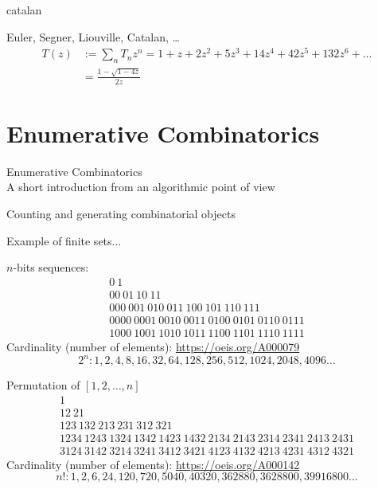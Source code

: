 \documentclass[compress,11pt]{beamer}
\begin{document}
\begin{frame}{catalan}

  Euler, Segner, Liouville, Catalan, \dots
  \begin{equation*}
  \begin{split}
    T(z) &:= \sum_n T_n z^n = 1 + z +2 z^2 +5 z^3 + 14 z^4 + 42 z^5 + 132 z^6 +
    \dots \\
    &= \frac{1 - \sqrt{1-4z}}{2z}
  \end{split}
\end{equation*}
\end{frame}

\section{Enumerative Combinatorics}

\begin{frame}{Enumerative Combinatorics \\
    A short introduction from an algorithmic point of view}

  \Large
  \begin{tcolorbox}
    Counting and generating combinatorial objects
  \end{tcolorbox}
\end{frame}

\begin{frame}{Example of finite sets...}

  $n$-bits sequences:
  \begin{gather*}
    0\ 1 \\[4mm]
    00\ 01\ 10\ 11 \\[4mm]
    000\ 001\ 010\ 011\ 100\ 101\ 110\ 111 \\[4mm]
    0000\ 0001\ 0010\ 0011\ 0100\ 0101\ 0110\ 0111 \\
    1000\ 1001\ 1010\ 1011\ 1100\ 1101\ 1110\ 1111
  \end{gather*}
  Cardinality (number of elements): \url{https://oeis.org/A000079}
  \[2^n : 1, 2, 4, 8, 16, 32, 64, 128, 256, 512, 1024, 2048, 4096 \dots\]
\end{frame}


\begin{frame}{Permutation of $[1,2,\dots,n]$}
  \begin{gather*}
    1 \\[4mm]
    12\ 21 \\[4mm]
    123\ 132\ 213\ 231\ 312\ 321 \\[4mm]
    1234\ 1243\ 1324\ 1342\ 1423\ 1432\ 2134\ 2143\ 2314\ 2341\ 2413\ 2431\\
    3124\ 3142\ 3214\ 3241\ 3412\ 3421\ 4123\ 4132\ 4213\ 4231\ 4312\ 4321
  \end{gather*}
  Cardinality (number of elements): \url{https://oeis.org/A000142}
  \[n! : 1, 2, 6, 24, 120, 720, 5040, 40320, 362880, 3628800, 39916800 \dots\]
\end{frame}
\end{document}
